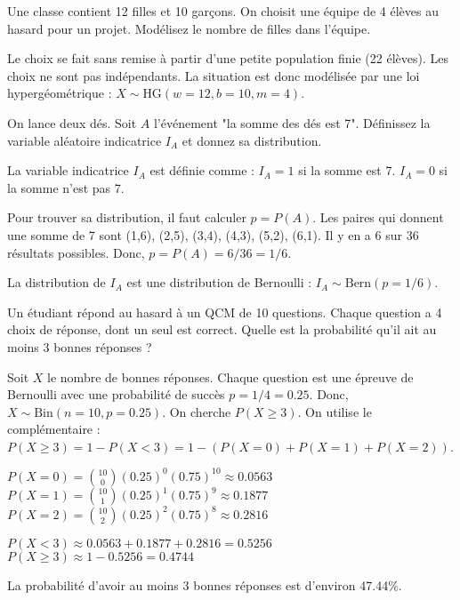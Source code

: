 \begin{exercicebox}
Une classe contient 12 filles et 10 garçons. On choisit une équipe de 4 élèves au hasard pour un projet. Modélisez le nombre de filles dans l'équipe.
\end{exercicebox}

\begin{correctionbox}
Le choix se fait sans remise à partir d'une petite population finie (22 élèves). Les choix ne sont pas indépendants. La situation est donc modélisée par une loi hypergéométrique : $X \sim \text{HG}(w=12, b=10, m=4)$.
\end{correctionbox}

\begin{exercicebox}
On lance deux dés. Soit $A$ l'événement "la somme des dés est 7". Définissez la variable aléatoire indicatrice $I_A$ et donnez sa distribution.
\end{exercicebox}

\begin{correctionbox}
La variable indicatrice $I_A$ est définie comme :
$I_A = 1$ si la somme est 7.
$I_A = 0$ si la somme n'est pas 7.

Pour trouver sa distribution, il faut calculer $p = P(A)$. Les paires qui donnent une somme de 7 sont (1,6), (2,5), (3,4), (4,3), (5,2), (6,1). Il y en a 6 sur 36 résultats possibles.
Donc, $p = P(A) = 6/36 = 1/6$.

La distribution de $I_A$ est une distribution de Bernoulli : $I_A \sim \text{Bern}(p=1/6)$.
\end{correctionbox}

\begin{exercicebox}
Un étudiant répond au hasard à un QCM de 10 questions. Chaque question a 4 choix de réponse, dont un seul est correct. Quelle est la probabilité qu'il ait au moins 3 bonnes réponses ?
\end{exercicebox}

\begin{correctionbox}
Soit $X$ le nombre de bonnes réponses. Chaque question est une épreuve de Bernoulli avec une probabilité de succès $p = 1/4 = 0.25$. Donc, $X \sim \text{Bin}(n=10, p=0.25)$.
On cherche $P(X \ge 3)$. On utilise le complémentaire : $P(X \ge 3) = 1 - P(X < 3) = 1 - (P(X=0) + P(X=1) + P(X=2))$.

$P(X=0) = \binom{10}{0}(0.25)^0(0.75)^{10} \approx 0.0563$
$P(X=1) = \binom{10}{1}(0.25)^1(0.75)^9 \approx 0.1877$
$P(X=2) = \binom{10}{2}(0.25)^2(0.75)^8 \approx 0.2816$

$P(X < 3) \approx 0.0563 + 0.1877 + 0.2816 = 0.5256$
$P(X \ge 3) \approx 1 - 0.5256 = 0.4744$

La probabilité d'avoir au moins 3 bonnes réponses est d'environ 47.44\%.
\end{correctionbox}